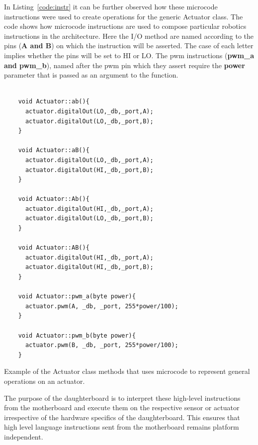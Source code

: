 	In Listing~\ref{code:instr} it can be further observed how these microcode instructions were used to create operations for the generic Actuator class.
The code shows how microcode instructions are used to compose particular robotics instructions in the \xten architecture. Here the I/O method are named according to the pins (\textbf{A and B}) on which the instruction will be asserted. The case of each letter implies whether the pins will be set to HI or LO. The pwm instructions (\textbf{pwm\_a and pwm\_b}), named after the pwm pin which they assert require the \textbf{power} parameter that is passed as an argument to the function.
	
    \begin{listing}
    \footnotesize
    {\fontsize{8}{6}\selectfont
    \begin{verbatim}

    void Actuator::ab(){
      actuator.digitalOut(LO,_db,_port,A);
      actuator.digitalOut(LO,_db,_port,B);
    }

    void Actuator::aB(){
      actuator.digitalOut(LO,_db,_port,A);
      actuator.digitalOut(HI,_db,_port,B);
    }

    void Actuator::Ab(){
      actuator.digitalOut(HI,_db,_port,A);
      actuator.digitalOut(LO,_db,_port,B);
    }

    void Actuator::AB(){
      actuator.digitalOut(HI,_db,_port,A);
      actuator.digitalOut(HI,_db,_port,B);
    }

    void Actuator::pwm_a(byte power){
      actuator.pwm(A, _db, _port, 255*power/100);
    }

    void Actuator::pwm_b(byte power){
      actuator.pwm(B, _db, _port, 255*power/100);
    }

    \end{verbatim}
    }
    \caption{Example of the Actuator class methods that uses microcode to represent general operations on an actuator.} \label{code:instr}
    \end{listing}
    
	The purpose of the daughterboard is to interpret these high-level instructions from the motherboard and execute them on the respective sensor or actuator irrespective of the hardware specifics of the daughterboard. This ensures that high level language instructions sent from the motherboard remains platform independent.
	
	
	

